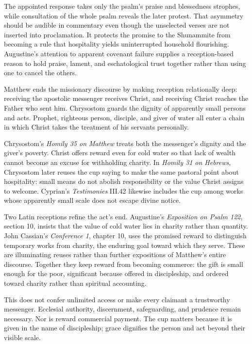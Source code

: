\begin{deepstudy}
The appointed response takes only the psalm's praise and blessedness strophes, while consultation of the whole psalm reveals the later protest. That asymmetry should be audible in commentary even though the unselected verses are not inserted into proclamation. It protects the promise to the Shunammite from becoming a rule that hospitality yields uninterrupted household flourishing. Augustine's attention to apparent covenant failure supplies a reception-based reason to hold praise, lament, and eschatological trust together rather than using one to cancel the others.

Matthew ends the missionary discourse by making reception relationally deep: receiving the apostolic messenger receives Christ, and receiving Christ reaches the Father who sent him. Chrysostom guards the dignity of apparently small persons and acts. Prophet, righteous person, disciple, and giver of water all enter a chain in which Christ takes the treatment of his servants personally.

Chrysostom's \emph{Homily 35 on Matthew} treats both the messenger's dignity and the giver's poverty. Christ offers reward even for cold water so that lack of wealth cannot become an excuse for withholding charity. In \emph{Homily 31 on Hebrews}, Chrysostom later reuses the cup saying to make the same pastoral point about hospitality: small means do not abolish responsibility or the value Christ assigns to welcome. Cyprian's \emph{Testimonies} III.42 likewise includes the cup among works whose apparently small scale does not escape divine notice.

Two Latin receptions refine the act's end. Augustine's \emph{Exposition on Psalm 122}, section 10, insists that the value of cold water lies in charity rather than quantity. John Cassian's \emph{Conference 1}, chapter 10, uses the promised reward to distinguish temporary works from charity, the enduring goal toward which they serve. These are illuminating reuses rather than further expositions of Matthew's entire discourse. Together they keep reward from becoming commerce: the gift is small enough for the poor, significant because offered in discipleship, and ordered toward charity rather than spiritual accounting.

This does not confer unlimited access or make every claimant a trustworthy messenger. Ecclesial authority, discernment, safeguarding, and prudence remain necessary. Nor is reward commercial payment. The cup matters because it is given in the name of discipleship; grace dignifies the person and act beyond their visible scale.


\end{deepstudy}
